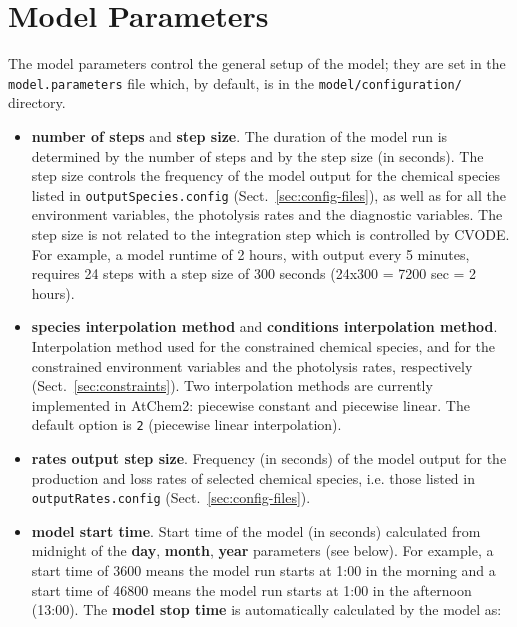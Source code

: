 \section{Model Parameters} \label{sec:model-parameters}

The model parameters control the general setup of the model; they are
set in the \texttt{model.parameters} file which, by default, is
in the \texttt{model/configuration/} directory.

\begin{itemize}
\item \textbf{number of steps} and \textbf{step size}. The duration of
  the model run is determined by the number of steps and by the step
  size (in seconds). The step size controls the frequency of the model
  output for the chemical species listed in \texttt{outputSpecies.config}
  (Sect.~\ref{sec:config-files}), as well as for all the environment
  variables, the photolysis rates and the diagnostic variables. The
  step size is not related to the integration step
  which is controlled by CVODE.\\
  For example, a model runtime of 2 hours, with output every 5
  minutes, requires 24 steps with a step size of 300 seconds (24x300 =
  7200 sec = 2 hours).
\item \textbf{species interpolation method} and
  \textbf{conditions interpolation method}. Interpolation method used
  for the constrained chemical species, and for the constrained
  environment variables and the photolysis rates, respectively
  (Sect.~\ref{sec:constraints}). Two interpolation methods are
  currently implemented in AtChem2: piecewise constant and piecewise
  linear. The default option is \texttt{2} (piecewise linear
  interpolation).
\item \textbf{rates output step size}. Frequency (in seconds) of the
  model output for the production and loss rates of selected chemical
  species, i.e. those listed in \texttt{outputRates.config}
  (Sect.~\ref{sec:config-files}).
\item \textbf{model start time}. Start time of the model (in seconds)
  calculated from midnight of the \textbf{day}, \textbf{month},
  \textbf{year} parameters (see below). For example, a start time of
  3600 means the model run starts at 1:00 in the morning and a start
  time of 46800 means the model run starts at 1:00 in the afternoon
  (13:00). The \textbf{model stop time} is automatically calculated by
  the model as:
  \begin{verbatim}

\end{verbatim}
\end{itemize}
